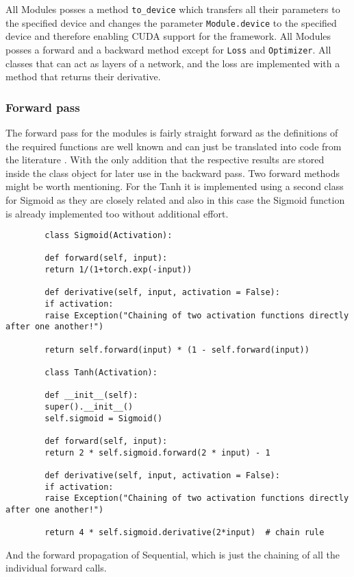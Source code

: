 \documentclass[11pt,english]{article}
\begin{document}
	All Modules posses a method \lstinline|to_device| which transfers all their parameters to the specified device and changes the parameter \lstinline|Module.device| to the specified device and therefore enabling CUDA support for the framework. All Modules posses a forward and a backward method except for \lstinline|Loss| and \lstinline|Optimizer|. All classes that can act as layers of a network, and the loss are implemented with a method that returns their derivative.
	
	\subsubsection*{Forward pass}
	
	The forward pass for the modules is fairly straight forward as the definitions of the required functions are well known and can just be translated into code from the literature \cite{Fleuret2022,Goodfellow-et-al-2016}. With the only addition that the respective results are stored inside the class object for later use in the backward pass. Two forward methods might be worth mentioning. For the Tanh it is implemented using a second class for Sigmoid as they are closely related and also in this case the Sigmoid function is already implemented too without additional effort.
	
	\begin{lstlisting}
		class Sigmoid(Activation):
		
		def forward(self, input):
		return 1/(1+torch.exp(-input))
		
		def derivative(self, input, activation = False):
		if activation:
		raise Exception("Chaining of two activation functions directly after one another!")
		
		return self.forward(input) * (1 - self.forward(input))
		
		class Tanh(Activation):
		
		def __init__(self):
		super().__init__()
		self.sigmoid = Sigmoid()
		
		def forward(self, input):
		return 2 * self.sigmoid.forward(2 * input) - 1
		
		def derivative(self, input, activation = False):
		if activation:
		raise Exception("Chaining of two activation functions directly after one another!")
		
		return 4 * self.sigmoid.derivative(2*input)  # chain rule  
	\end{lstlisting}
	
	And the forward propagation of Sequential, which is just the chaining of 
	all the individual forward calls.
	
\end{document}
